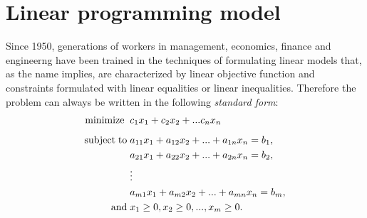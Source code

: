 \documentclass[a4paper,10 pt,titlepage,twoside]{book}
\theoremstyle{plain}
\theoremstyle{definition}
\theoremstyle{remark}
\begin{document}
\section{Linear programming model}

Since 1950, generations of workers in management, economics, finance and engineerng have been trained in the techniques of formulating linear models that,
as the name implies, are characterized by linear objective function and constraints formulated with linear equalities or linear inequalities. Therefore the problem can always be written
in the following \textit{standard form}:
\begin{alignat*}{1}\label{eq:stdform}
\text{minimize\;}\; &c_1 x_1 + c_2 x_2+ ... c_n x_n\\[1.8mm]
\text{subject\;to\;} &a_{11} x_1 + a_{12} x_2+ ... +a_{1n}x_n = b_1,\\
&a_{21} x_1 + a_{22} x_2 + ... + a_{2n} x_n= b_2,\\
&\vdots\\
&a_{m1} x_1 + a_{m2} x_2 + ... + a_{mn} x_n= b_m,\\
\text{and}\; & x_1 \geq 0 , x_2 \geq 0, ... , x_m \geq 0.
 \end{alignat*}
\end{document}
